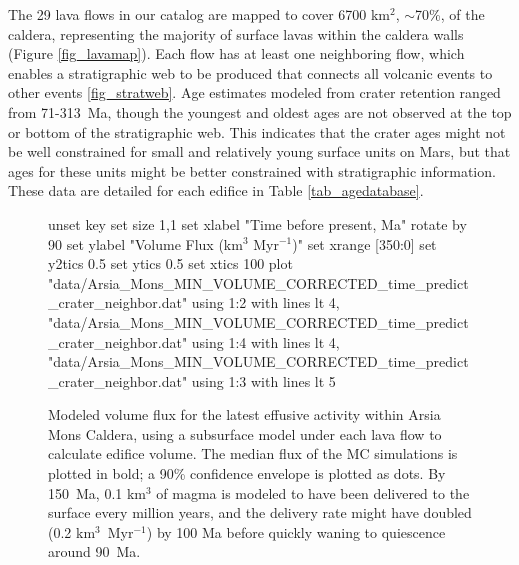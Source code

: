 The 29 lava flows in our catalog are mapped to cover 6700 km$^2$, $\sim$70\%, of the caldera, representing the majority of surface lavas within the caldera walls (Figure \ref{fig_lavamap}). Each flow has at least one neighboring flow, which enables a stratigraphic web to be produced that connects all volcanic events to other events \ref{fig_stratweb}. Age estimates modeled from crater retention ranged from 71-313~Ma, though the youngest and oldest ages are not observed at the top or bottom of the stratigraphic web. This indicates that the crater ages might not be well constrained for small and relatively young surface units on Mars, but that ages for these units might be better constrained with stratigraphic information. These data are detailed for each edifice in Table \ref{tab_agedatabase}.
	
	\begin{figure}[ht]
		\centering
		\begin{gnuplot}[terminal=latex, terminaloptions=rotate]
			unset key
			set size 1,1
			set xlabel "Time before present, Ma" rotate by 90
			set ylabel "Volume Flux (km$^3$ Myr$^{-1}$)"
			set xrange [350:0]
			set y2tics 0.5
			set ytics 0.5
			set xtics 100
			plot "data/Arsia_Mons_MIN_VOLUME_CORRECTED_time_predict_crater_neighbor.dat" using 1:2 with lines lt 4, "data/Arsia_Mons_MIN_VOLUME_CORRECTED_time_predict_crater_neighbor.dat" using 1:4 with lines lt 4, "data/Arsia_Mons_MIN_VOLUME_CORRECTED_time_predict_crater_neighbor.dat" using 1:3 with lines lt 5
		\end{gnuplot}
		\caption[Modeled volume flux for the latest effusive activity within Arsia Mons Caldera, using subsurface models.]{Modeled volume flux for the latest effusive activity within Arsia Mons Caldera, using a subsurface model under each lava flow to calculate edifice volume. The median flux of the MC simulations is plotted in bold; a 90\% confidence envelope is plotted as dots. By 150~Ma, 0.1 km$^3$ of magma is modeled to have been delivered to the surface every million years, and the delivery rate might have doubled (0.2 km$^3$~Myr$^{-1}$) by 100 Ma before quickly waning to quiescence around 90~Ma.}
		\label{fig_VERRMMINVOL}
	\end{figure}
